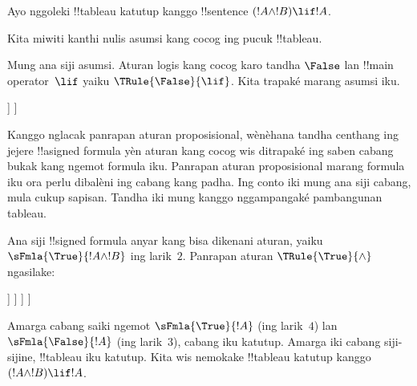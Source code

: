 \documentclass[../../../include/open-logic-section]{subfiles}
\begin{document}
      {}
      {}


\begin{ex}
Ayo nggoleki !!{tableau} katutup kanggo !!{sentence} $(!A \land !B) \lif !A$.

Kita miwiti kanthi nulis asumsi kang cocog ing pucuk
!!{tableau}.
\begin{oltableau}
  [\sFmla{\False}{(\formula{A} \land \formula{B}) \lif \formula{A}},
    just = \TAss]
\end{oltableau}

Mung ana siji asumsi. Aturan logis kang cocog karo tandha $\False$ lan !!{main operator}~$\lif$
yaiku $\TRule{\False}{\lif}$. Kita trapaké marang asumsi iku.
\begin{oltableau}
  [\sFmla{\False}{(\formula{A} \land \formula{B}) \lif \formula{A}},
    checked, just = \TAss
    [\sFmla{\True}{\formula{A} \land \formula{B}},
      just={\TRule{\False}{\lif}[1]}
      [\sFmla{\False}{\formula{A}}, just={\TRule{\False}{\lif}[1]}]
    ]
  ]
\end{oltableau}
Kanggo nglacak panrapan aturan proposisional, wènèhana tandha
centhang ing jejere !!a{signed formula} yèn aturan kang cocog wis
ditrapaké ing saben cabang bukak kang ngemot formula iku. Panrapan
aturan proposisional marang formula iku ora perlu dibalèni ing
cabang kang padha. Ing conto iki mung ana siji cabang, mula cukup
sapisan. Tandha iki mung kanggo nggampangaké pambangunan tableau.

Ana siji !!{signed formula} anyar kang bisa dikenani aturan, yaiku
$\sFmla{\True}{!A \land !B}$ ing larik~$2$. Panrapan aturan
$\TRule{\True}{\land}$ ngasilake:
\begin{oltableau}
  [\sFmla{\False}{(\formula{A} \land \formula{B}) \lif \formula{A}},
    checked, just = \TAss
    [\sFmla{\True}{\formula{A} \land \formula{B}},
      just={\TRule{\False}{\lif}[1]}, checked
      [\sFmla{\False}{\formula{A}}, just={\TRule{\False}{\lif}[1]}
        [\sFmla{\True}{\formula{A}}, just={\TRule{\True}{\land}[2]}
          [\sFmla{\True}{\formula{B}}, just={\TRule{\True}{\land}[2]}, close
          ]
        ]
      ]
    ]
  ]
\end{oltableau}
Amarga cabang saiki ngemot $\sFmla{\True}{!A}$ (ing larik~$4$) lan
$\sFmla{\False}{!A}$ (ing larik~$3$), cabang iku katutup. Amarga iki
cabang siji-sijine, !!{tableau} iku katutup. Kita wis nemokake
!!{tableau} katutup kanggo~$(!A \land !B) \lif !A$.
\end{ex}
\end{document}
